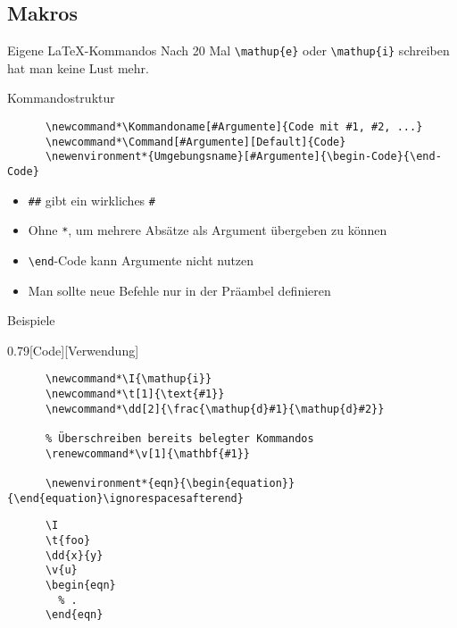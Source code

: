 \subsection{Makros}

\begin{frame}[fragile]{Eigene \LaTeX-Kommandos}
  Nach 20 Mal \lstinline+\mathup{e}+ oder \lstinline+\mathup{i}+ schreiben hat man keine Lust mehr.
  \vspace{1em}
  \begin{block}{Kommandostruktur}
    \begin{lstlisting}
      \newcommand*\Kommandoname[#Argumente]{Code mit #1, #2, ...}
      \newcommand*\Command[#Argumente][Default]{Code}
      \newenvironment*{Umgebungsname}[#Argumente]{\begin-Code}{\end-Code}
    \end{lstlisting}
  \end{block}
  \begin{itemize}
    \item \verb+##+ gibt ein wirkliches \verb+#+
    \item Ohne \texttt{*}, um mehrere Absätze als Argument übergeben zu können
    \item \lstinline+\end+-Code kann Argumente nicht nutzen
    \item Man sollte neue Befehle nur in der Präambel definieren
  \end{itemize}
\end{frame}

\begin{frame}[fragile]{Beispiele}
  \begin{CodeExample}{0.79}[Code][Verwendung]
    \begin{lstlisting}
      \newcommand*\I{\mathup{i}}
      \newcommand*\t[1]{\text{#1}}
      \newcommand*\dd[2]{\frac{\mathup{d}#1}{\mathup{d}#2}}

      % Überschreiben bereits belegter Kommandos
      \renewcommand*\v[1]{\mathbf{#1}}

      \newenvironment*{eqn}{\begin{equation}}{\end{equation}\ignorespacesafterend}
    \end{lstlisting}
  \CodeResult
    \begin{lstlisting}
      \I
      \t{foo}
      \dd{x}{y}
      \v{u}
      \begin{eqn}
        % .
      \end{eqn}
    \end{lstlisting}
  \end{CodeExample}
\end{frame}

